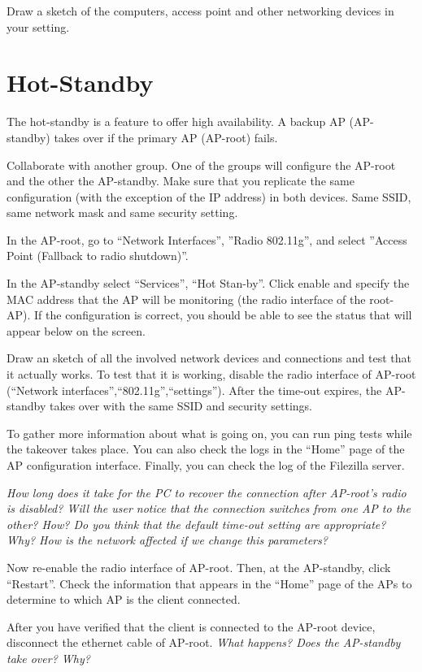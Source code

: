 Draw a sketch of the computers, access point and other networking devices in your setting.

\section{Hot-Standby}

The hot-standby is a feature to offer high availability.
A backup AP (AP-standby) takes over if the primary AP (AP-root) fails.

Collaborate with another group.
One of the groups will configure the AP-root and the other the AP-standby.
Make sure that you replicate the same configuration (with the exception of the IP address) in both devices.
Same SSID, same network mask and same security setting.

In the AP-root, go to ``Network Interfaces'', ''Radio 802.11g'', and select ''Access Point (Fallback to radio shutdown)''.

In the AP-standby select ``Services'', ``Hot Stan-by''.
Click enable and specify the MAC address that the AP will be monitoring (the radio interface of the root-AP).
If the configuration is correct, you should be able to see the status that will appear below on the screen.

Draw an sketch of all the involved network devices and connections and test that it actually works.
To test that it is working, disable the radio interface of AP-root (``Network interfaces'',``802.11g'',``settings'').
After the time-out expires, the AP-standby takes over with the same SSID and security settings.

To gather more information about what is going on, you can run ping tests while the takeover takes place.
You can also check the logs in the ``Home'' page of the AP configuration interface.
Finally, you can check the log of the Filezilla server.

\emph{How long does it take for the PC to recover the connection after AP-root's radio is disabled?
Will the user notice that the connection switches from one AP to the other? How?
Do you think that the default time-out setting are appropriate? Why?
How is the network affected if we change this parameters?
}

Now re-enable the radio interface of AP-root.
Then, at the AP-standby, click ``Restart''.
Check the information that appears in the ``Home'' page of the APs to determine to which AP is the client connected.

After you have verified that the client is connected to the AP-root device, disconnect the ethernet cable of AP-root.
\emph{What happens? Does the AP-standby take over? Why?}

